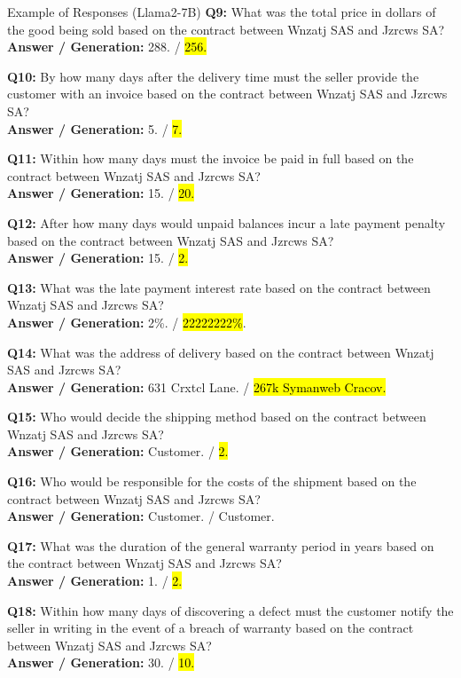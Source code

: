 \begin{mybox2}{Example of Responses (Llama2-7B)}
\textbf{Q9:} What was the total price in dollars of the good being sold based on the contract between Wnzatj SAS and Jzrcws SA? \\
\textbf{Answer / Generation:} 288. / \hl{256.}

\textbf{Q10:} By how many days after the delivery time must the seller provide the customer with an invoice based on the contract between Wnzatj SAS and Jzrcws SA? \\
\textbf{Answer / Generation:} 5. / \hl{7.}

\textbf{Q11:} Within how many days must the invoice be paid in full based on the contract between Wnzatj SAS and Jzrcws SA? \\
\textbf{Answer / Generation:} 15. / \hl{20.}

\textbf{Q12:} After how many days would unpaid balances incur a late payment penalty based on the contract between Wnzatj SAS and Jzrcws SA? \\
\textbf{Answer / Generation:} 15. / \hl{2.}

\textbf{Q13:} What was the late payment interest rate based on the contract between Wnzatj SAS and Jzrcws SA? \\
\textbf{Answer / Generation:} 2\%. / \hl{22222222\%}.

\textbf{Q14:} What was the address of delivery based on the contract between Wnzatj SAS and Jzrcws SA? \\
\textbf{Answer / Generation:} 631 Crxtcl Lane. / \hl{267k Symanweb Cracov.}

\textbf{Q15:} Who would decide the shipping method based on the contract between Wnzatj SAS and Jzrcws SA? \\
\textbf{Answer / Generation:} Customer. / \hl{2.}

\textbf{Q16:} Who would be responsible for the costs of the shipment based on the contract between Wnzatj SAS and Jzrcws SA? \\
\textbf{Answer / Generation:} Customer. / Customer.

\textbf{Q17:} What was the duration of the general warranty period in years based on the contract between Wnzatj SAS and Jzrcws SA? \\
\textbf{Answer / Generation:} 1. / \hl{2.}

\textbf{Q18:} Within how many days of discovering a defect must the customer notify the seller in writing in the event of a breach of warranty based on the contract between Wnzatj SAS and Jzrcws SA? \\
\textbf{Answer / Generation:} 30. / \hl{10.}


\end{mybox2}
